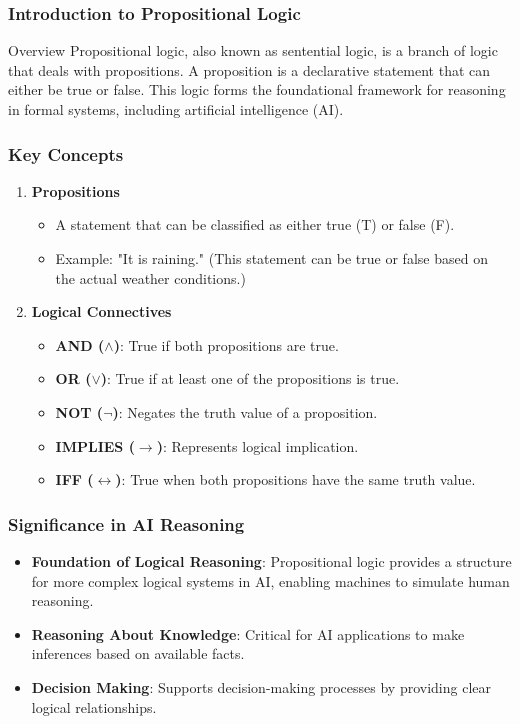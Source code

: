 \documentclass[aspectratio=169]{beamer}
\begin{document}
\frame{\titlepage}

\begin{frame}[fragile]
    \frametitle{Introduction to Propositional Logic}
    \begin{block}{Overview}
        Propositional logic, also known as sentential logic, is a branch of logic that deals with propositions. A proposition is a declarative statement that can either be true or false. This logic forms the foundational framework for reasoning in formal systems, including artificial intelligence (AI).
    \end{block}
\end{frame}

\begin{frame}[fragile]
    \frametitle{Key Concepts}
    \begin{enumerate}
        \item \textbf{Propositions}
            \begin{itemize}
                \item A statement that can be classified as either true (T) or false (F).
                \item Example: "It is raining." (This statement can be true or false based on the actual weather conditions.)
            \end{itemize}
        \item \textbf{Logical Connectives}
            \begin{itemize}
                \item \textbf{AND ($\land$)}: True if both propositions are true.
                \item \textbf{OR ($\lor$)}: True if at least one of the propositions is true.
                \item \textbf{NOT ($\neg$)}: Negates the truth value of a proposition.
                \item \textbf{IMPLIES ($\rightarrow$)}: Represents logical implication.
                \item \textbf{IFF ($\leftrightarrow$)}: True when both propositions have the same truth value.
            \end{itemize}
    \end{enumerate}
\end{frame}

\begin{frame}[fragile]
    \frametitle{Significance in AI Reasoning}
    \begin{itemize}
        \item \textbf{Foundation of Logical Reasoning}: Propositional logic provides a structure for more complex logical systems in AI, enabling machines to simulate human reasoning.
        \item \textbf{Reasoning About Knowledge}: Critical for AI applications to make inferences based on available facts.
        \item \textbf{Decision Making}: Supports decision-making processes by providing clear logical relationships.
    \end{itemize}
\end{frame}
\end{document}

